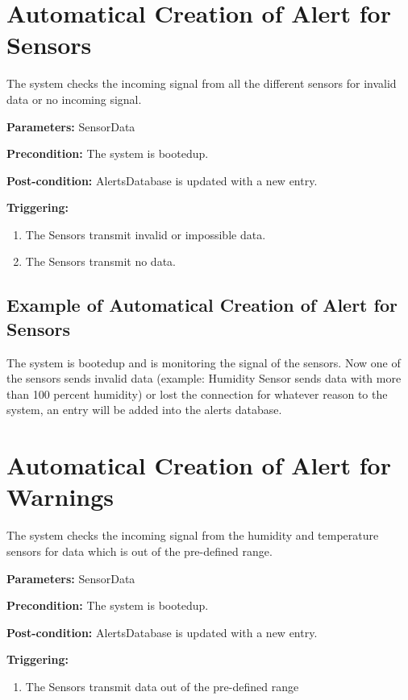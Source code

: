 \break
\section{Automatical Creation of Alert for Sensors}
\label{operation:AddAlertForSensors}
The system checks the incoming signal from all the different sensors for invalid
data or no incoming signal.

\begin{description}

\item \textbf{Parameters:} SensorData
\item \textbf{Precondition:} The system is bootedup.
\item \textbf{Post-condition:} AlertsDatabase is updated with a new entry.

\item \textbf{Triggering:}
\begin{enumerate}
\item The Sensors transmit invalid or impossible data.
\item The Sensors transmit no data.
\end{enumerate}
\end{description}

\subsection{Example of Automatical Creation of Alert for Sensors}
The system is bootedup and is monitoring the signal of the sensors.
Now one of the sensors sends invalid data (example: Humidity Sensor sends data
with more than 100 percent humidity) or lost the connection for whatever reason
to the system, an entry will be added into the alerts database.




\section{Automatical Creation of Alert for Warnings}
\label{operation:AddAlertForWarnigns}
The system checks the incoming signal from the humidity and temperature sensors
for data which is out of the pre-defined range.

\begin{description}

\item \textbf{Parameters:} SensorData
\item \textbf{Precondition:} The system is bootedup.
\item \textbf{Post-condition:} AlertsDatabase is updated with a new entry.

\item \textbf{Triggering:}
\begin{enumerate}
\item The Sensors transmit data out of the pre-defined range
\end{enumerate}
\end{description}

